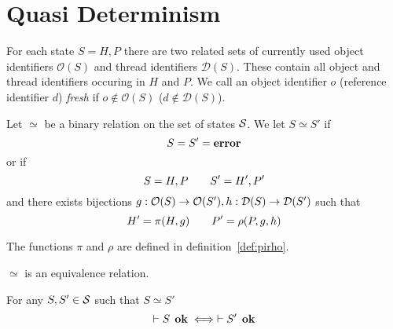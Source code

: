 \chapter{Quasi Determinism}
\label{cha:determinism}


\begin{definition}
  For each state $S = H, P$ there are two related sets of currently used object
  identifiers $\mathcal{O}(S)$ and thread identifiers $\mathcal{D}(S)$. These contain
  all object and thread identifiers occuring in $H$ and $P$. We call an object
  identifier $o$ (reference identifier $d$) \emph{fresh} if $o \not\in \mathcal{O}(S)$ ($d \not\in
  \mathcal{D}(S)$).
\end{definition}

\begin{definition} \label{def:eqrel}
  Let $\simeq$ be a binary relation on the set of states $\mathcal{S}$.
  We let $S \simeq S'$ if
  \begin{equation*}
    S = S' = \mbox{{\bf error}}
  \end{equation*}
  or if
  \begin{equation}
    S = H, P \quad\quad S' = H', P'
  \end{equation}
  and there exists bijections $g: \mathcal{O}(S) \to \mathcal{O}(S'), h: \mathcal{D}(S) \to \mathcal{D}(S')$
  such that
  \begin{equation}
    H' = \pi(H, g) \quad\quad P' = \rho(P, g, h)
  \end{equation}
  
  The functions $\pi$ and $\rho$ are defined in definition~\ref{def:pirho}.
\end{definition}



\begin{proposition} \label{prop:eqrel}
  $\simeq$ is an equivalence relation.
\end{proposition}

\begin{proposition} \label{prop:eqrel_stateok}
  For any $S, S' \in \mathcal{S}$ such that $S \simeq S'$
  \begin{equation}
    \vdash S \:\: \mbox{\bf ok} \iff \vdash S' \:\: \mbox{\bf ok}
  \end{equation}
\end{proposition}


\begin{theorem}
\end{theorem}

